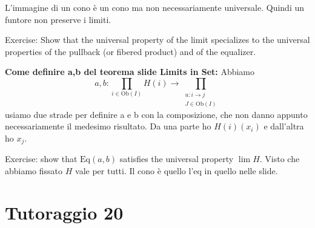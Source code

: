 \documentclass[a4paper]{article}
\begin{document}
L'immagine di un cono è un cono ma non necessariamente universale.
Quindi un funtore non preserve i limiti.

Exercise: Show that the universal property of the limit specializes
to the universal properties of the pullback (or fibered product) and of the equalizer.

\textbf{Come definire a,b del teorema slide Limits in Set:}
Abbiamo
\[
    a,b \colon \prod_{i \in \text{Ob}(I)} H(i)
    \to \prod_{\substack{u \colon i \to j \\ J \in \text{Ob}(I)}}
\]
usiamo due strade per definire a e b con la composizione, che non danno appunto necessariamente
il medesimo risultato. Da una parte ho \(H(i)(x_i)\) e dall'altra ho \(x_j\).

Exercise: show that \(\text{Eq}(a,b)\) satisfies
the universal property \(\lim H\).
Visto che abbiamo fissato \(H\) vale per tutti.
Il cono è quello l'eq in quello nelle slide.


\section{Tutoraggio 20}
\end{document}
